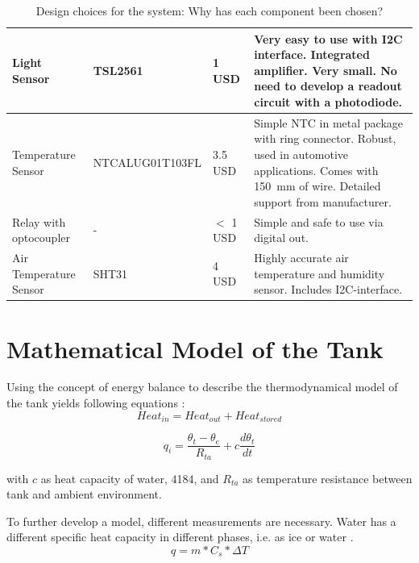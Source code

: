 \begin{table}[H]
\begin{tabular}{p{} p{} p{} 
		p{} }
        Light Sensor &
        TSL2561 &
        1 USD & 
        Very easy to use with \gls{I2C} interface. Integrated amplifier. Very small. No need to develop a readout circuit with a photodiode.\\\hline 
        Temperature Sensor &
        NTCALUG01T103FL &
        3.5 USD & 
        Simple \gls{NTC} in metal package with ring connector. Robust, used in automotive applications. Comes with \SI{150}{\milli\metre} of wire. Detailed support from manufacturer.\\\hline
        Relay with optocoupler &
        - &
        \(<\) 1 USD & 
        Simple and safe to use via digital out.\\\hline 
        Air Temperature Sensor &
        SHT31 &
        4 USD & 
        Highly accurate air temperature and humidity sensor. Includes \gls{I2C}-interface.\\\hline
	\end{tabular}
	\caption{Design choices for the system: Why has each component been chosen?}
	\label{tab:design_choices_uv_light}
\end{table}




\section{Mathematical Model of the Tank}

Using the concept of energy balance to describe the thermodynamical model of the tank yields following equations \cite{online:mathModel}:
\begin{equation*}
Heat_{in} = Heat_{out} + Heat_{stored}
\end{equation*}

\begin{equation}
q_i=\frac{\theta_t - \theta_e}{R_{ta}}+c\frac{d\theta_t}{dt}
\end{equation}

with \(c\) as heat capacity of water, 4184\si{\frac{\joule}{\kilogram\kelvin}}, and
\(R_{ta}\) as temperature resistance between tank and ambient environment.

To further develop a model, different measurements are necessary. Water has a different specific heat capacity in different phases, i.e. as ice or water \cite{online:watercurve}.
\begin{equation}
q=m*C_s*\Delta T
\end{equation}


